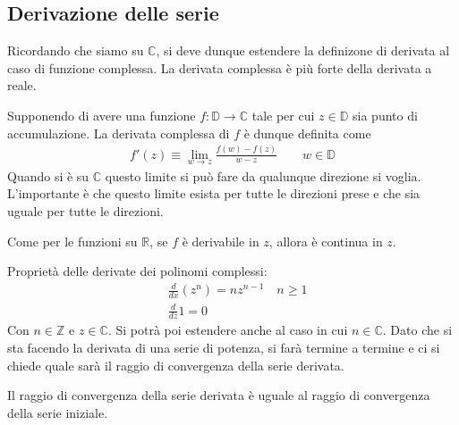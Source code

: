 \documentclass[a4paper, oneside]{article}
\begin{document}
\subsection{Derivazione delle serie}
Ricordando che siamo su $\mathbb{C}$, si deve dunque estendere la definizone di 
derivata al caso di funzione complessa. La derivata complessa è più forte della derivata a
reale.
\begin{definition}[Derivazione]
    Supponendo di avere una funzione $f : \mathbb{D} \to \mathbb{C}$ tale per cui $z \in \mathbb{D}$ sia punto di 
    accumulazione. La derivata complessa di $f$ è dunque definita come 
    \begin{align}
        f'(z) \equiv \lim_{w \to z} \frac{f(w) - f(z)}{w - z} \qquad w \in \mathbb{D} 
    \end{align}
    Quando si è su $\mathbb{C}$ questo limite si può fare da qualunque direzione si voglia. L'importante 
    è che questo limite esista per tutte le direzioni prese e che sia uguale per tutte le direzioni. 
\end{definition}
\begin{theorem}
    Come per le funzioni su $\mathbb{R}$, se $f$ è derivabile in $z$, allora è continua in $z$. 
\end{theorem} \noindent
Proprietà delle derivate dei polinomi complessi:
\begin{align*}
    &\frac{d}{dx}(z^{n}) = nz^{n - 1} \quad n \geq 1 \\
    &\frac{d}{dz}1 = 0
\end{align*}
Con $n \in \mathbb{Z}$ e $z \in \mathbb{C}$. Si potrà poi estendere anche al caso in cui $n \in \mathbb{C}$.
Dato che si sta facendo la derivata di una serie di potenza, si farà termine a termine 
e ci si chiede quale sarà il raggio di convergenza della serie derivata.
\begin{theorem}
    Il raggio di convergenza della serie derivata è uguale al raggio di convergenza della serie 
    iniziale.
\end{theorem}
\end{document}
